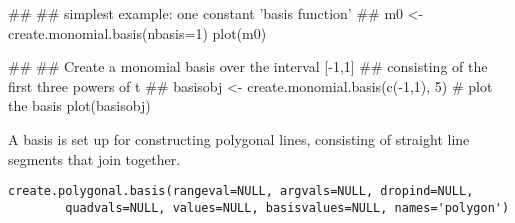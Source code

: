 \documentclass{article}
\begin{document}
\begin{Examples}
\begin{ExampleCode}
##
## simplest example: one constant 'basis function'
##
m0 <- create.monomial.basis(nbasis=1)
plot(m0)

##
## Create a monomial basis over the interval [-1,1]
##  consisting of the first three powers of t
##
basisobj <- create.monomial.basis(c(-1,1), 5)
#  plot the basis
plot(basisobj)
\end{ExampleCode}
\end{Examples}

\begin{Description}\relax
A basis is set up for constructing polygonal lines, consisting of
straight line segments that join together.
\end{Description}
\begin{Usage}
\begin{verbatim}
create.polygonal.basis(rangeval=NULL, argvals=NULL, dropind=NULL,
        quadvals=NULL, values=NULL, basisvalues=NULL, names='polygon')
\end{verbatim}
\end{Usage}
\end{document}
